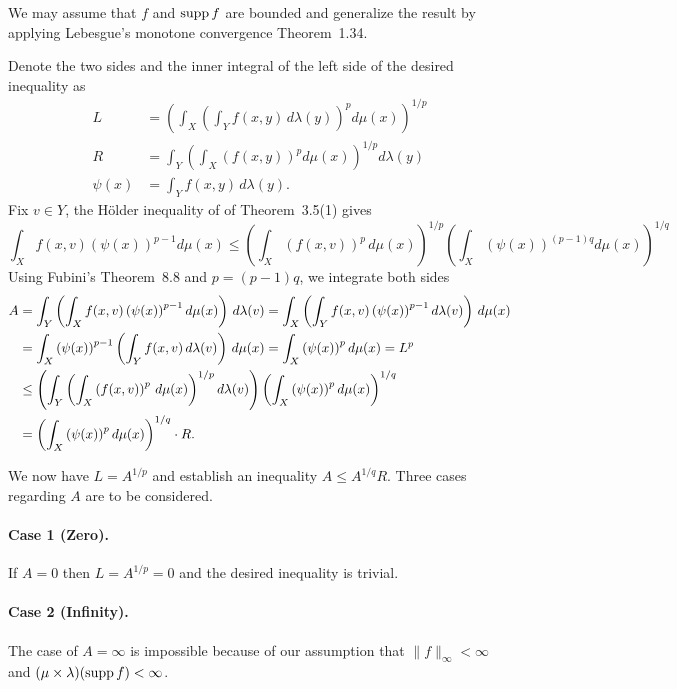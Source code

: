 \begin{enumerate}
We may assume that $f$ and \(\mathop{\rm supp}\nolimits f\) are bounded
and generalize the result by applying
Lebesgue's monotone convergence Theorem~1.34.

Denote the two sides
and the inner integral of the left side of the desired inequality as
\begin{align*}
L &= \left(\int_X 
        \left(\int_Y f(x,y)\,d\lambda(y)\right)^p d\mu(x)\right)^{1/p} \\
R &= \int_Y\left(\int_X \left(f(x,y)\right)^pd\mu(x) \right)^{1/p} d\lambda(y) \\
\psi(x) &= \int_Y f(x,y)\,d\lambda(y).
\end{align*}
Fix \(v\in Y\), the 
H\"older inequality of of Theorem~3.5(1) gives
\begin{equation*}
\int_X f(x,v)\left(\psi(x)\right)^{p-1} d\mu(x)
\leq \left(\int_X \left(f(x,v)\right)^p\,d\mu(x)\right)^{1/p} 
     \left(\int_X \left(\psi(x)\right)^{(p-1)q} d\mu(x)\right)^{1/q}
\end{equation*}
Using Fubini's Theorem~8.8 and \(p = (p-1)q\), we integrate both sides
\begin{align}
A
&= \int_Y 
    \left(\int_X f(x,v)\left(\psi(x)\right)^{p-1} d\mu(x)\right)\,d\lambda(v)
 = \int_X 
    \left(\int_Y f(x,v)\left(\psi(x)\right)^{p-1} d\lambda(v)\right)\,d\mu(x)
   \notag \\
&= \int_X 
    \left(\psi(x)\right)^{p-1} \left(\int_Y f(x,v)\,d\lambda(v)\right)\,d\mu(x)
 = \int_X \left(\psi(x)\right)^p d\mu(x) = L^p
   \notag \\
&\leq  \label{eq:minkowski:gen1}
    \left(
      \int_Y
        \left(\int_X \left(f(x,v)\right)^p\,d\mu(x)\right)^{1/p} 
      d\lambda(v)
    \right)
    \left(\int_X \left(\psi(x)\right)^p d\mu(x)\right)^{1/q} 
  \\
&= \left(\int_X \left(\psi(x)\right)^p d\mu(x)\right)^{1/q} \cdot R.
  \notag
\end{align}

We now have \(L = A^{1/p}\) and establish an inequality
\(A \leq A^{1/q} R\).
Three cases regarding $A$ are to be considered.

\paragraph{Case 1 (Zero).} 
If \(A=0\) then \(L = A^{1/p}=0\) and the desired inequality is trivial.  

\paragraph{Case 2 (Infinity).}
The case of \(A=\infty\) is impossible because of
our assumption that \(\|f\|_\infty<\infty\) 
and \((\mu\times\lambda)(\mathop{\rm supp}\nolimits f) < \infty\).


\end{enumerate}
